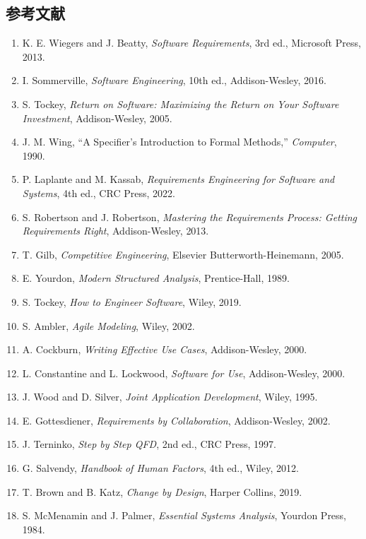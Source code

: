 \subsection{参考文献}

\footnotesize
\begin{enumerate}[leftmargin=2.2em,itemsep=.15ex]
\item K. E. Wiegers and J. Beatty, \textit{Software Requirements}, 3rd ed., Microsoft Press, 2013.
\item I. Sommerville, \textit{Software Engineering}, 10th ed., Addison-Wesley, 2016.
\item S. Tockey, \textit{Return on Software: Maximizing the Return on Your Software Investment}, Addison-Wesley, 2005.
\item J. M. Wing, ``A Specifier's Introduction to Formal Methods,'' \textit{Computer}, 1990.
\item P. Laplante and M. Kassab, \textit{Requirements Engineering for Software and Systems}, 4th ed., CRC Press, 2022.
\item S. Robertson and J. Robertson, \textit{Mastering the Requirements Process: Getting Requirements Right}, Addison-Wesley, 2013.
\item T. Gilb, \textit{Competitive Engineering}, Elsevier Butterworth-Heinemann, 2005.
\item E. Yourdon, \textit{Modern Structured Analysis}, Prentice-Hall, 1989.
\item S. Tockey, \textit{How to Engineer Software}, Wiley, 2019.
\item S. Ambler, \textit{Agile Modeling}, Wiley, 2002.
\item A. Cockburn, \textit{Writing Effective Use Cases}, Addison-Wesley, 2000.
\item L. Constantine and L. Lockwood, \textit{Software for Use}, Addison-Wesley, 2000.
\item J. Wood and D. Silver, \textit{Joint Application Development}, Wiley, 1995.
\item E. Gottesdiener, \textit{Requirements by Collaboration}, Addison-Wesley, 2002.
\item J. Terninko, \textit{Step by Step QFD}, 2nd ed., CRC Press, 1997.
\item G. Salvendy, \textit{Handbook of Human Factors}, 4th ed., Wiley, 2012.
\item T. Brown and B. Katz, \textit{Change by Design}, Harper Collins, 2019.
\item S. McMenamin and J. Palmer, \textit{Essential Systems Analysis}, Yourdon Press, 1984.

\end{enumerate}
